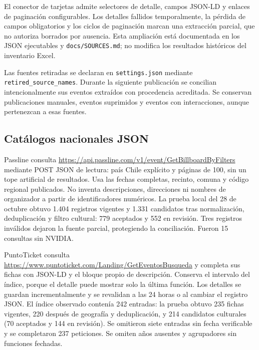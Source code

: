 \documentclass[11pt,a4paper]{article}
\begin{document}
El conector de tarjetas admite selectores de detalle, campos JSON-LD y enlaces de paginaci\'{o}n configurables. Los detalles fallidos temporalmente, la p\'{e}rdida de campos obligatorios y los ciclos de paginaci\'{o}n marcan una extracci\'{o}n parcial, que no autoriza borrados por ausencia. Esta ampliaci\'{o}n est\'{a} documentada en los JSON ejecutables y \texttt{docs/SOURCES.md}; no modifica los resultados hist\'{o}ricos del inventario Excel.

Las fuentes retiradas se declaran en \texttt{settings.json} mediante \texttt{retired\_source\_names}. Durante la siguiente publicaci\'{o}n se concilian intencionalmente sus eventos extra\'{i}dos con procedencia acreditada. Se conservan publicaciones manuales, eventos suprimidos y eventos con interacciones, aunque pertenezcan a esas fuentes.

\subsection{Cat\'{a}logos nacionales JSON}

Passline consulta \url{https://api.passline.com/v1/event/GetBillboardByFilters} mediante POST JSON de lectura: pa\'{i}s Chile expl\'{i}cito y p\'{a}ginas de 100, sin un tope artificial de resultados. Usa las fechas completas, recinto, comuna y c\'{o}digo regional publicados. No inventa descripciones, direcciones ni nombres de organizador a partir de identificadores num\'{e}ricos. La prueba local del 28 de octubre obtuvo 1.404 registros vigentes y 1.331 candidatos tras normalizaci\'{o}n, deduplicaci\'{o}n y filtro cultural: 779 aceptados y 552 en revisi\'{o}n. Tres registros inv\'{a}lidos dejaron la fuente parcial, protegiendo la conciliaci\'{o}n. Fueron 15 consultas sin NVIDIA.

PuntoTicket consulta \url{https://www.puntoticket.com/Landing/GetEventosBusqueda} y completa sus fichas con JSON-LD y el bloque propio de descripci\'{o}n. Conserva el intervalo del \'{i}ndice, porque el detalle puede mostrar solo la \'{u}ltima funci\'{o}n. Los detalles se guardan incrementalmente y se revalidan a las 24 horas o al cambiar el registro JSON. El \'{i}ndice observado conten\'{i}a 242 entradas: la prueba obtuvo 235 fichas vigentes, 220 despu\'{e}s de geograf\'{i}a y deduplicaci\'{o}n, y 214 candidatos culturales (70 aceptados y 144 en revisi\'{o}n). Se omitieron siete entradas sin fecha verificable y se completaron 237 peticiones. Se omiten a\~{n}os ausentes y agrupadores sin funciones fechadas.
\end{document}
